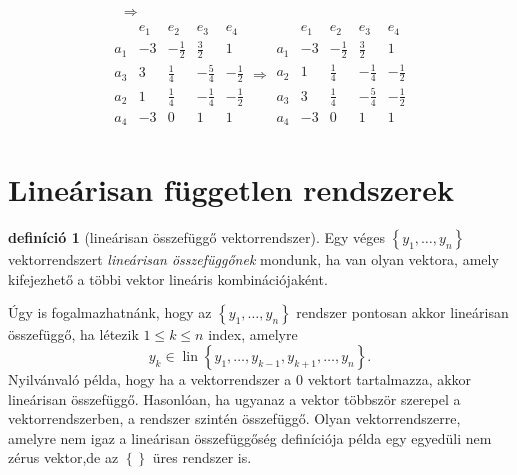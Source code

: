 \documentclass[9pt, showtrims]{memoir}
\theoremstyle{plain}
\theoremstyle{remark}
\theoremstyle{definition}
\newtheorem{definition}[proposition]{definíció}
\DeclareMathOperator{\lin}{lin}
\begin{document}
\begin{multline*}
\begin{array}{r|c|cccc}
    \end{array}\Rightarrow
    \\
    \begin{array}{r|cccc}
        &e_1&e_2&e_3&e_4\\
        \hline
        a_1 & -3&-\frac{1}{2}&\frac{3}{2}&1\\
        a_3 & 3&\frac{1}{4}&-\frac{5}{4}&-\frac{1}{2}\\
        a_2 & 1&\frac{1}{4}&-\frac{1}{4}&-\frac{1}{2}\\
        a_4 & -3&0&1&1
    \end{array}\Rightarrow
    \begin{array}{r|cccc}
        &e_1&e_2&e_3&e_4\\
        \hline
        a_1 & -3&-\frac{1}{2}&\frac{3}{2}&1\\
        a_2 & 1&\frac{1}{4}&-\frac{1}{4}&-\frac{1}{2}\\
        a_3 & 3&\frac{1}{4}&-\frac{5}{4}&-\frac{1}{2}\\
        a_4 & -3&0&1&1
    \end{array}
\end{multline*}

\section{Lineárisan független rendszerek}
\begin{definition}[lineárisan összefüggő vektorrendszer]
    Egy véges $\left\{ y_1,\dots,y_n \right\}$ vektorrendszert \emph{lineárisan összefüggőnek}
    mondunk, ha van olyan vektora, amely kifejezhető a többi vektor lineáris kombinációjaként.
\end{definition}
Úgy is fogalmazhatnánk, hogy az $\left\{ y_1,\dots,y_n \right\}$ rendszer pontosan akkor
lineárisan összefüggő, ha létezik $1\leq k\leq n$ index, amelyre
\[
    y_k\in\lin\left\{ y_1,\dots,y_{k-1},y_{k+1},\dots,y_n \right\}.
\]
Nyilvánvaló példa, hogy ha a vektorrendszer a $0$ vektort tartalmazza, 
akkor lineárisan összefüggő. 
Hasonlóan, ha ugyanaz a vektor többször szerepel a vektorrendszerben, a rendszer szintén összefüggő.
Olyan vektorrendszerre, amelyre nem igaz a lineárisan összefüggőség definíciója példa egy egyedüli nem zérus vektor,de az $\left\{  \right\}$ üres rendszer is.
\end{document}
